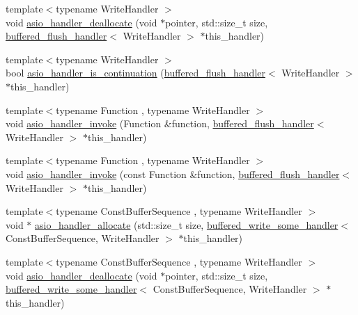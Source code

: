 \begin{DoxyCompactItemize}
\item 
{\footnotesize template$<$typename Write\+Handler $>$ }\\void \hyperlink{namespaceasio_1_1detail_aa278da4ab23cc9fc4a0ad33cb8948622}{asio\+\_\+handler\+\_\+deallocate} (void $\ast$pointer, std\+::size\+\_\+t size, \hyperlink{classasio_1_1detail_1_1buffered__flush__handler}{buffered\+\_\+flush\+\_\+handler}$<$ Write\+Handler $>$ $\ast$this\+\_\+handler)
\item 
{\footnotesize template$<$typename Write\+Handler $>$ }\\bool \hyperlink{namespaceasio_1_1detail_af993f54edccc86bd268a98400160032e}{asio\+\_\+handler\+\_\+is\+\_\+continuation} (\hyperlink{classasio_1_1detail_1_1buffered__flush__handler}{buffered\+\_\+flush\+\_\+handler}$<$ Write\+Handler $>$ $\ast$this\+\_\+handler)
\item 
{\footnotesize template$<$typename Function , typename Write\+Handler $>$ }\\void \hyperlink{namespaceasio_1_1detail_a80d92ac88bbf7f8ae832b2556357bb5f}{asio\+\_\+handler\+\_\+invoke} (Function \&function, \hyperlink{classasio_1_1detail_1_1buffered__flush__handler}{buffered\+\_\+flush\+\_\+handler}$<$ Write\+Handler $>$ $\ast$this\+\_\+handler)
\item 
{\footnotesize template$<$typename Function , typename Write\+Handler $>$ }\\void \hyperlink{namespaceasio_1_1detail_a061e00d6f94d8e26e4089a7daf1d4566}{asio\+\_\+handler\+\_\+invoke} (const Function \&function, \hyperlink{classasio_1_1detail_1_1buffered__flush__handler}{buffered\+\_\+flush\+\_\+handler}$<$ Write\+Handler $>$ $\ast$this\+\_\+handler)
\item 
{\footnotesize template$<$typename Const\+Buffer\+Sequence , typename Write\+Handler $>$ }\\void $\ast$ \hyperlink{namespaceasio_1_1detail_a3517079a3f96f3cb4dba972349b0e56b}{asio\+\_\+handler\+\_\+allocate} (std\+::size\+\_\+t size, \hyperlink{classasio_1_1detail_1_1buffered__write__some__handler}{buffered\+\_\+write\+\_\+some\+\_\+handler}$<$ Const\+Buffer\+Sequence, Write\+Handler $>$ $\ast$this\+\_\+handler)
\item 
{\footnotesize template$<$typename Const\+Buffer\+Sequence , typename Write\+Handler $>$ }\\void \hyperlink{namespaceasio_1_1detail_a3968daf77de6ccae85c5408acd3339a8}{asio\+\_\+handler\+\_\+deallocate} (void $\ast$pointer, std\+::size\+\_\+t size, \hyperlink{classasio_1_1detail_1_1buffered__write__some__handler}{buffered\+\_\+write\+\_\+some\+\_\+handler}$<$ Const\+Buffer\+Sequence, Write\+Handler $>$ $\ast$this\+\_\+handler)

\end{DoxyCompactItemize}
